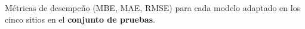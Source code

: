 \documentclass[letterpaper,12pt, twoside]{report}
\providecommand{\DIFdeltex}[1]{{\protect\color{red} \scriptsize #1}} %
\providecommand{\DIFdelFL}[1]{\DIFdel{#1}} %
\providecommand{\DIFdel}[1]{\texorpdfstring{\DIFdeltex{#1}}{}} %
\begin{document}
{%
\DIFdelFL{Métricas de desempeño (MBE, MAE, RMSE) para cada modelo adaptado en los cinco sitios en el \textbf{conjunto de pruebas}.}}

\end{document}
